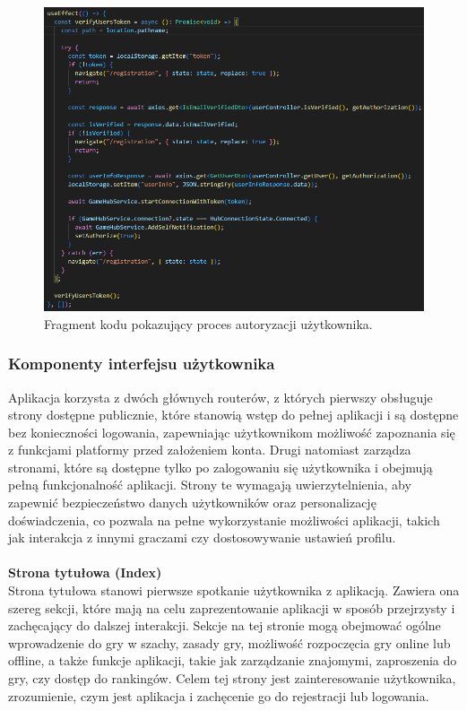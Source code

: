 \documentclass[12pt,a4paper]{article}
\begin{document}
\vspace{1cm}
\begin{figure}[h!]
    \centering
    \includegraphics[width=1\textwidth]{images/ex_router_authorization.png}
    \caption{Fragment kodu pokazujący proces autoryzacji użytkownika.}
\end{figure}

\newpage

\subsubsection{Komponenty interfejsu użytkownika}

Aplikacja korzysta z dwóch głównych routerów, z których pierwszy obsługuje strony dostępne publicznie, które stanowią wstęp do pełnej aplikacji i są dostępne bez konieczności logowania, zapewniając użytkownikom możliwość zapoznania się z funkcjami platformy przed założeniem konta. Drugi natomiast zarządza stronami, które są dostępne tylko po zalogowaniu się użytkownika i obejmują pełną funkcjonalność aplikacji. Strony te wymagają uwierzytelnienia, aby zapewnić bezpieczeństwo danych użytkowników oraz personalizację doświadczenia, co pozwala na pełne wykorzystanie możliwości aplikacji, takich jak interakcja z innymi graczami czy dostosowywanie ustawień profilu.
\\\\

\noindent \textbf{Strona tytułowa (Index)}\\
Strona tytułowa stanowi pierwsze spotkanie użytkownika z aplikacją. Zawiera ona szereg sekcji, które mają na celu zaprezentowanie aplikacji w sposób przejrzysty i zachęcający do dalszej interakcji. Sekcje na tej stronie mogą obejmować ogólne wprowadzenie do gry w szachy, zasady gry, możliwość rozpoczęcia gry online lub offline, a także funkcje aplikacji, takie jak zarządzanie znajomymi, zaproszenia do gry, czy dostęp do rankingów. Celem tej strony jest zainteresowanie użytkownika, zrozumienie, czym jest aplikacja i zachęcenie go do rejestracji lub logowania.
\\
\end{document}
